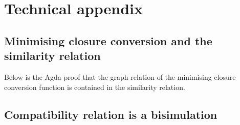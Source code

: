 \documentclass[bsc,frontabs,oneside,singlespacing,parskip,deptreport]{infthesis}
\theoremstyle{definition}
\theoremstyle{lemma}
\begin{document}



\chapter{Technical appendix}
\label{cha:technical-appendix}

\section{Minimising closure conversion and the similarity relation}
\label{sec:minim-clos-conv-2}

Below is the Agda proof that the graph relation of the minimising
closure conversion function is contained in the similarity relation.


\section{Compatibility relation is a bisimulation}
\label{sec:comp-relat-bisim-1}
\end{document}
